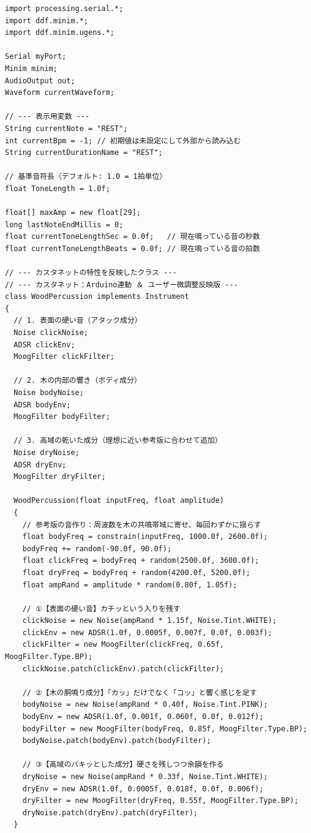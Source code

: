 \begin{lstlisting}
import processing.serial.*;
import ddf.minim.*;
import ddf.minim.ugens.*;

Serial myPort;
Minim minim;
AudioOutput out;
Waveform currentWaveform;

// --- 表示用変数 ---
String currentNote = "REST";
int currentBpm = -1; // 初期値は未設定にして外部から読み込む
String currentDurationName = "REST";

// 基準音符長（デフォルト: 1.0 = 1拍単位）
float ToneLength = 1.0f;

float[] maxAmp = new float[29];
long lastNoteEndMillis = 0;
float currentToneLengthSec = 0.0f;   // 現在鳴っている音の秒数
float currentToneLengthBeats = 0.0f; // 現在鳴っている音の拍数

// --- カスタネットの特性を反映したクラス ---
// --- カスタネット：Arduino連動 ＆ ユーザー微調整反映版 ---
class WoodPercussion implements Instrument
{
  // 1. 表面の硬い音（アタック成分）
  Noise clickNoise;
  ADSR clickEnv;
  MoogFilter clickFilter; 

  // 2. 木の内部の響き（ボディ成分）
  Noise bodyNoise;
  ADSR bodyEnv;
  MoogFilter bodyFilter;

  // 3. 高域の乾いた成分（理想に近い参考版に合わせて追加）
  Noise dryNoise;
  ADSR dryEnv;
  MoogFilter dryFilter;

  WoodPercussion(float inputFreq, float amplitude)
  {
    // 参考版の音作り：周波数を木の共鳴帯域に寄せ、毎回わずかに揺らす
    float bodyFreq = constrain(inputFreq, 1000.0f, 2600.0f);
    bodyFreq += random(-90.0f, 90.0f);
    float clickFreq = bodyFreq + random(2500.0f, 3600.0f);
    float dryFreq = bodyFreq + random(4200.0f, 5200.0f);
    float ampRand = amplitude * random(0.80f, 1.05f);

    // ①【表面の硬い音】カチッという入りを残す
    clickNoise = new Noise(ampRand * 1.15f, Noise.Tint.WHITE);
    clickEnv = new ADSR(1.0f, 0.0005f, 0.007f, 0.0f, 0.003f);
    clickFilter = new MoogFilter(clickFreq, 0.65f, MoogFilter.Type.BP);
    clickNoise.patch(clickEnv).patch(clickFilter);

    // ②【木の胴鳴り成分】「カッ」だけでなく「コッ」と響く感じを足す
    bodyNoise = new Noise(ampRand * 0.40f, Noise.Tint.PINK);
    bodyEnv = new ADSR(1.0f, 0.001f, 0.060f, 0.0f, 0.012f);
    bodyFilter = new MoogFilter(bodyFreq, 0.85f, MoogFilter.Type.BP);
    bodyNoise.patch(bodyEnv).patch(bodyFilter);

    // ③【高域のパキッとした成分】硬さを残しつつ余韻を作る
    dryNoise = new Noise(ampRand * 0.33f, Noise.Tint.WHITE);
    dryEnv = new ADSR(1.0f, 0.0005f, 0.018f, 0.0f, 0.006f);
    dryFilter = new MoogFilter(dryFreq, 0.55f, MoogFilter.Type.BP);
    dryNoise.patch(dryEnv).patch(dryFilter);
  }


\end{lstlisting}
